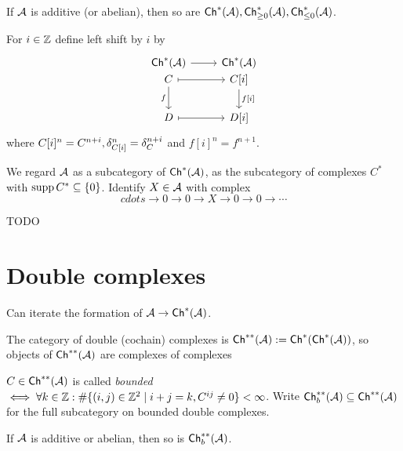 \documentclass[a4paper]{report}
\begin{document}
\begin{prop}
If $\mathcal{A}$ is additive (or abelian), then so are $\mathsf{Ch}^*(\mathcal{A}), \mathsf{Ch}^*_{\ge 0}(\mathcal{A}), \mathsf{Ch}^*_{\le 0}(\mathcal{A})$.
\end{prop}

\begin{defi}
  For $i \in \mathbb{Z}$ define left shift by $i$ by
  \[\begin{tikzcd}
      \coch(\A) \arrow[r] & \coch(\A) \\[-20]
      C \arrow[r, mapsto] \arrow[d, "f"'] & C[i] \arrow[d, "{f[i]}"] \\
      D \arrow[r, mapsto] & D[i]
    \end{tikzcd}\]
  where $C[i]^{n} = C^{n+i}, \delta_{C[i]}^{n} = \delta_{C}^{n+i}$ and $f[i]^{n} = f^{n+1}$.
\end{defi}


\begin{conv}
We regard $\mathcal{A}$ as a subcategory of $\mathsf{Ch}^*(\mathcal{A})$, as the subcategory of complexes $C^{*}$ with $\operatorname{supp} C^{*} \subseteq \{0\}$. Identify $X \in \mathcal{A}$ with complex \[cdots \to 0 \to 0 \to X \to 0 \to 0 \to \cdots\]
\end{conv}

\begin{exmp}
TODO
\end{exmp}

\section{Double complexes}
Can iterate the formation of $\mathcal{A} \to \mathsf{Ch}^*(\mathcal{A})$.
\begin{defi}The category of double (cochain) complexes is $\mathsf{Ch}^{**}(\mathcal{A}):= \mathsf{Ch}^*(\mathsf{Ch}^*(\mathcal{A}))$, so objects of $\mathsf{Ch}^{**}(\mathcal{A})$ are complexes of complexes
\end{defi}

\begin{defi}
$C \in \mathsf{Ch}^{**}(\mathcal{A})$ is called \emph{bounded} $\iff \forall k \in \mathbb{Z}: \#\{(i,j) \in \mathbb{Z}^{2} \mid i+j = k, C^{ij} \ne 0\} < \infty$. Write $\mathsf{Ch}^{**}_{b}(\mathcal{A}) \subseteq \mathsf{Ch}^{**}(\mathcal{A})$ for the full subcategory on bounded double complexes.
\end{defi}

\begin{exer}
If $\mathcal{A}$ is additive or abelian, then so is $\mathsf{Ch}^{**}_{b}(\mathcal{A})$.
\end{exer}
\end{document}
